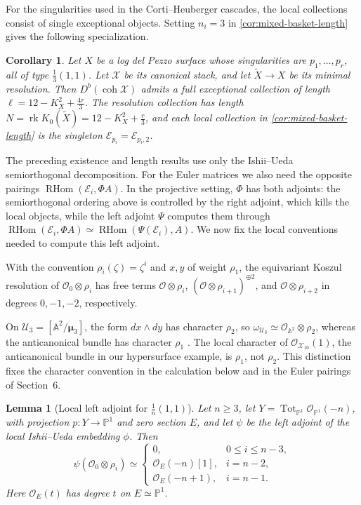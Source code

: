 \documentclass[11pt]{article}
\theoremstyle{plain}
\newtheorem{lemma}[lemma]{Lemma}
\newtheorem{corollary}[corollary]{Corollary}
\theoremstyle{definition}
\theoremstyle{remark}
\newcommand{\A}{\mathbb A}
\newcommand{\Pp}{\mathbb P}
\newcommand{\Db}{D^b}
\newcommand{\coh}{\operatorname{coh}}
\newcommand{\rk}{\operatorname{rk}}
\newcommand{\RHom}{\operatorname{RHom}}
\newcommand{\XX}{\mathcal X}
\newcommand{\muthree}{\boldsymbol{\mu}_3}
\newcommand{\OO}{\mathcal O}
\begin{document}
For the singularities used in the Corti--Heuberger cascades, the local
collections consist of single exceptional objects. Setting \(n_i=3\) in \cref{cor:mixed-basket-length}
gives the following specialization.

\begin{corollary}\label{cor:length}
Let \(X\) be a log del Pezzo surface whose singularities are
\(p_1,\ldots,p_r\), all of type \(\frac13(1,1)\). Let \(\XX\) be
its canonical stack, and let
\(\widetilde X\to X\) be its minimal resolution. Then
\(\Db(\coh\XX)\) admits a full exceptional collection of length
\(\ell=12-K_X^2+\frac{4r}{3}\). The resolution collection has length
\(N=\rk K_0(\widetilde X)=12-K_X^2+\frac r3\), and each local collection in
\cref{cor:mixed-basket-length} is the singleton
\(\mathcal E_{p_i}=\mathcal E_{p_i,2}\).
\end{corollary}

The preceding existence and length results use only the Ishii--Ueda
semiorthogonal decomposition. For the Euler matrices we also need the opposite
pairings \(\RHom(\mathcal E_i,\Phi A)\). In the projective setting,
\(\Phi\) has both adjoints: the semiorthogonal ordering above is controlled
by the right adjoint, which kills the local objects, while the left adjoint
\(\Psi\) computes them through
\(\RHom(\mathcal E_i,\Phi A)\simeq\RHom(\Psi(\mathcal E_i),A)\).
We now fix the local conventions needed to compute this left adjoint.

With the convention \(\rho_i(\zeta)=\zeta^i\) and \(x,y\) of weight
\(\rho_1\), the equivariant Koszul resolution of
\(\OO_0\otimes\rho_i\) has free terms \(\OO\otimes\rho_i\),
\((\OO\otimes\rho_{i+1})^{\oplus2}\), and
\(\OO\otimes\rho_{i+2}\) in degrees \(0,-1,-2\), respectively.

On \(\mathcal U_3=[\A^2/\muthree]\), the form \(dx\wedge dy\) has
character \(\rho_2\), so
\(\omega_{\mathcal U_3}\simeq\OO_{\A^2}\otimes\rho_2\), whereas the
anticanonical bundle has character \(\rho_1\)
\cite[Section~3, equation~(17)]{GugiattiRota2023}. The local character of
\(\OO_{\mathcal X_{10}}(1)\), the anticanonical bundle in our hypersurface
example, is \(\rho_1\), not \(\rho_2\). This distinction fixes the character
convention in the calculation below and in the Euler pairings of Section~6.

\begin{lemma}[Local left adjoint for \(\frac1n(1,1)\)]
\label{lem:cyclic-left-adjoint}
Let \(n\geq3\), let
\(Y=\operatorname{Tot}_{\Pp^1}\OO_{\Pp^1}(-n)\), with projection
\(p:Y\to\Pp^1\) and zero section \(E\), and let \(\psi\) be the left
adjoint of the local Ishii--Ueda embedding \(\phi\). Then
\begin{equation}\label{eq:cyclic-left-adjoint}
\psi(\OO_0\otimes\rho_i)\simeq
\begin{cases}
0,&0\leq i\leq n-3,\\
\OO_E(-n)[1],&i=n-2,\\
\OO_E(-n+1),&i=n-1.
\end{cases}
\end{equation}
Here \(\OO_E(t)\) has degree \(t\) on \(E\simeq\Pp^1\).
\end{lemma}
\end{document}
